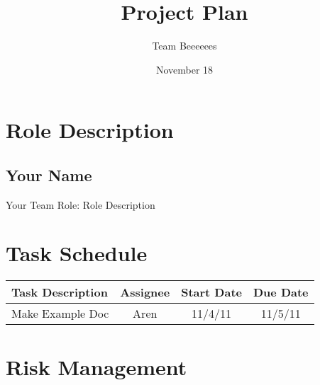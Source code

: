 \documentclass[12pt, letterpaper]{article}
\begin{document}
\title{Project Plan}
\author{Team Beeeeees}
\date{November 18}
\maketitle
\section{Role Description}
  \subsection{Your Name}
  Your Team Role: Role Description
\section{Task Schedule}
\begin{center}
  \begin{tabular}{l || c | c | c | }
    Task Description & Assignee & Start Date & Due Date \\
    \hline
    Make Example Doc & Aren & 11/4/11 & 11/5/11 \\
    \hline
  \end{tabular}
\end{center}

\section{Risk Management}
\end{document}
